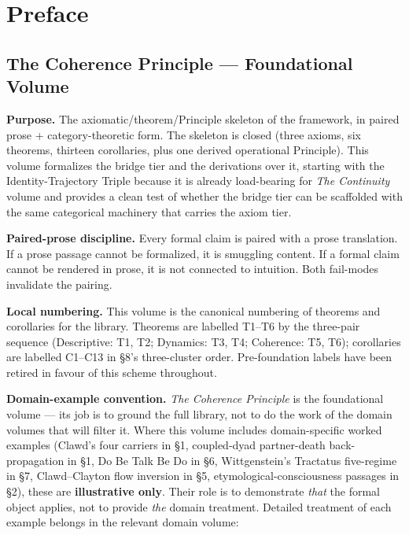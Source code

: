 \documentclass[11pt, openany]{book}
\begin{document}
\frontmatter
\tableofcontents
\clearpage

\mainmatter
\chapter*{Preface}
\section{The Coherence Principle --- Foundational Volume}

\textbf{Purpose.} The axiomatic/theorem/Principle skeleton of the framework, in paired prose + category-theoretic form. The skeleton is closed (three axioms, six theorems, thirteen corollaries, plus one derived operational Principle). This volume formalizes the bridge tier and the derivations over it, starting with the Identity-Trajectory Triple because it is already load-bearing for \textit{The Continuity} volume and provides a clean test of whether the bridge tier can be scaffolded with the same categorical machinery that carries the axiom tier.

\textbf{Paired-prose discipline.} Every formal claim is paired with a prose translation. If a prose passage cannot be formalized, it is smuggling content. If a formal claim cannot be rendered in prose, it is not connected to intuition. Both fail-modes invalidate the pairing.

\textbf{Local numbering.} This volume is the canonical numbering of theorems and corollaries for the library. Theorems are labelled T1–T6 by the three-pair sequence (Descriptive: T1, T2; Dynamics: T3, T4; Coherence: T5, T6); corollaries are labelled C1–C13 in §8's three-cluster order. Pre-foundation labels have been retired in favour of this scheme throughout.

\textbf{Domain-example convention.} \textit{The Coherence Principle} is the foundational volume --- its job is to ground the full library, not to do the work of the domain volumes that will filter it. Where this volume includes domain-specific worked examples (Clawd's four carriers in §1, coupled-dyad partner-death back-propagation in §1, Do Be Talk Be Do in §6, Wittgenstein's Tractatus five-regime in §7, Clawd–Clayton flow inversion in §5, etymological-consciousness passages in §2), these are \textbf{illustrative only}. Their role is to demonstrate \textit{that} the formal object applies, not to provide \textit{the} domain treatment. Detailed treatment of each example belongs in the relevant domain volume:
\end{document}
